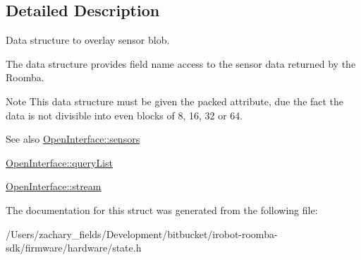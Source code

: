 \subsection{Detailed Description}
Data structure to overlay sensor blob. 

The data structure provides field name access to the sensor data returned by the Roomba. \begin{DoxyNote}{Note}
This data structure must be given the packed attribute, due the fact the data is not divisible into even blocks of 8, 16, 32 or 64. 
\end{DoxyNote}
\begin{DoxySeeAlso}{See also}
\hyperlink{classroomba_1_1_open_interface_aa676703a4c79547397eaa89ddb9e207c}{Open\+Interface\+::sensors} 

\hyperlink{classroomba_1_1_open_interface_a4a7308a7119c6a462389d9ffa3785f87}{Open\+Interface\+::query\+List} 

\hyperlink{classroomba_1_1_open_interface_af7a1adea482ac71fa9057842a955af6e}{Open\+Interface\+::stream} 
\end{DoxySeeAlso}


The documentation for this struct was generated from the following file\+:\begin{DoxyCompactItemize}
\item 
/\+Users/zachary\+\_\+fields/\+Development/bitbucket/irobot-\/roomba-\/sdk/firmware/hardware/state.\+h\end{DoxyCompactItemize}
